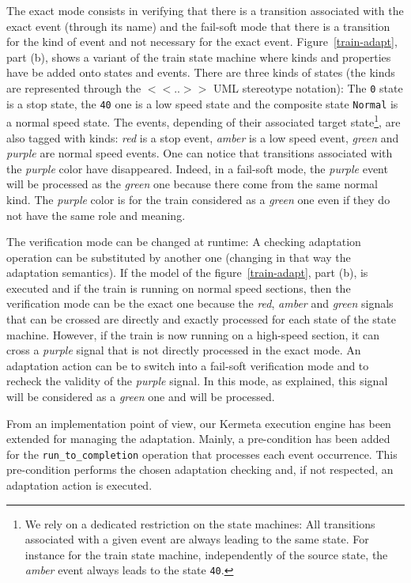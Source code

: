 \documentclass[english, 10pt]{llncs}
\begin{document}
The exact mode consists in verifying that there is a transition
associated with the exact event (through its name) and the fail-soft
mode that there is a transition for the kind of event and not
necessary for the exact event. Figure~\ref{train-adapt}, part (b),
shows a variant of the train state machine where kinds and properties
have be added onto states and events. There are three kinds of states
(the kinds are represented through the $<<..>>$ UML stereotype
notation): The \texttt{0} state is a stop state, the \texttt{40} one
is a low speed state and the composite state \texttt{Normal} is a
normal speed state. The events, depending of their associated target
state\footnote{We rely on a dedicated restriction on the state
  machines: All transitions associated with a given event are always
  leading to the same state. For instance for the train state machine,
  independently of the source state, the \textit{amber} event always
  leads to the state \texttt{40}.}, are also tagged with kinds:
\textit{red} is a stop event, \textit{amber} is a low speed event,
\textit{green} and \textit{purple} are normal speed events. One can
notice that transitions associated with the \textit{purple} color have
disappeared. Indeed, in a fail-soft mode, the \textit{purple} event
will be processed as the \textit{green} one because there come from
the same normal kind. The \textit{purple} color is for the train
considered as a \textit{green} one even if they do not have the same
role and meaning.

The verification mode can be changed at runtime: A checking adaptation
operation can be substituted by another one (changing in that way the
adaptation semantics). If the model of the figure~\ref{train-adapt},
part (b), is executed and if the train is running on normal speed
sections, then the verification mode can be the exact one because the
\textit{red}, \textit{amber} and \textit{green} signals that can be
crossed are directly and exactly processed for each state of the state
machine. However, if the train is now running on a high-speed section,
it can cross a \textit{purple} signal that is not directly processed
in the exact mode. An adaptation action can be to switch into a
fail-soft verification mode and to recheck the validity of the
\textit{purple} signal. In this mode, as explained, this signal will
be considered as a \textit{green} one and will be processed.

From an implementation point of view, our Kermeta execution engine has
been extended for managing the adaptation. Mainly, a pre-condition has
been added for the \texttt{run\_to\_completion} operation that
processes each event occurrence. This pre-condition performs the chosen
adaptation checking and, if not respected, an adaptation action is
executed.
\end{document}

